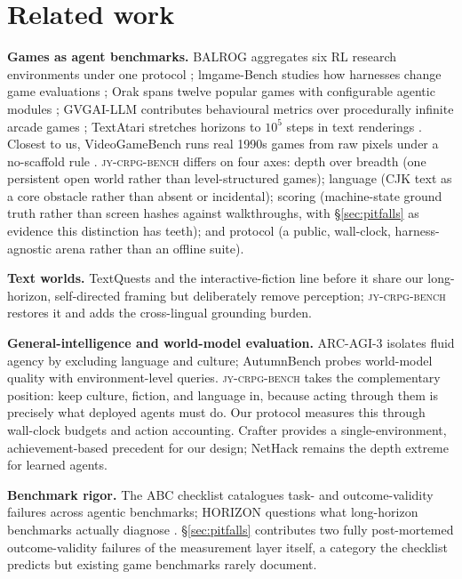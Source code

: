 \documentclass{article} %
\newcommand{\bench}{\textsc{jy-crpg-bench}}
\begin{document}
\section{Related work}
\label{sec:related}

\textbf{Games as agent benchmarks.} BALROG aggregates six RL research
environments under one protocol \citep{paglieri2025balrog}; lmgame-Bench
studies how harnesses change game evaluations \citep{hu2026lmgame}; Orak
spans twelve popular games with configurable agentic modules
\citep{park2026orak}; GVGAI-LLM contributes behavioural metrics over
procedurally infinite arcade games \citep{li2025gvgai}; TextAtari
stretches horizons to $10^5$ steps in text renderings
\citep{li2025textatari}. Closest to us, VideoGameBench runs real 1990s
games from raw pixels under a no-scaffold rule
\citep{zhang2025videogamebench}. \bench{} differs on four axes: depth over
breadth (one persistent open world rather than level-structured games);
language (CJK text as a core obstacle rather than absent or incidental);
scoring (machine-state ground truth rather than screen hashes against walkthroughs,
with \S\ref{sec:pitfalls} as evidence this distinction has teeth); and protocol (a public, wall-clock, harness-agnostic arena rather
than an offline suite).

\textbf{Text worlds.} TextQuests \citep{phan2025textquests} and the
interactive-fiction line before it share our long-horizon, self-directed
framing but deliberately remove perception; \bench{} restores it and adds
the cross-lingual grounding burden.

\textbf{General-intelligence and world-model evaluation.} ARC-AGI-3
\citep{arc2026arcagi3} isolates fluid agency by excluding language and
culture; AutumnBench \citep{warrier2025benchmarking} probes world-model quality
with environment-level queries. \bench{} takes the complementary position:
keep culture, fiction, and language in, because acting through them is
precisely what deployed agents must do. Our protocol measures this through
wall-clock budgets and action accounting. Crafter
\citep{hafner2021benchmarking} provides a single-environment,
achievement-based precedent for our design; NetHack \citep{kuttler2020nethack}
remains the depth extreme for learned agents.

\textbf{Benchmark rigor.} The ABC checklist \citep{zhu2025establishing} catalogues
task- and outcome-validity failures across agentic benchmarks; HORIZON
questions what long-horizon benchmarks actually diagnose
\citep{wang2026long}. \S\ref{sec:pitfalls} contributes two fully
post-mortemed outcome-validity failures of the measurement layer itself, a
category the checklist predicts but existing game benchmarks rarely
document.
\end{document}

